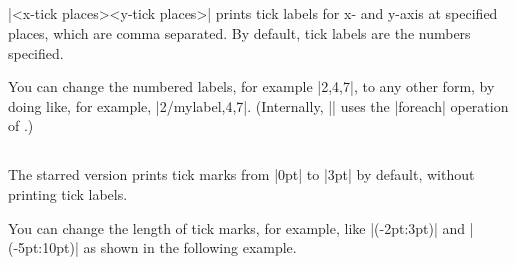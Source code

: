 \subsection{\protect\cmd{\tzticks}}
\label{ssi:tzticks}

\icmd{\tzticks}|{<x-tick places>}{<y-tick places>}| prints tick labels for x- and y-axis at specified places, which are comma separated.
By default, tick labels are the numbers specified.

\begin{tzcode}{.3}
\end{tzcode}

You can change the numbered labels, for example |{2,4,7}|, to any other form, by doing like, for example, |{2/mylabel,4,7}|. (Internally, |\tzticks| uses the |foreach| operation of \Tikz.)

\begin{tzcode}{.3}
\end{tzcode}

\subsection{\protect\cmd{\tzticks*}}
\label{ssi:tzticks*}

The starred version \icmd{\tzticks*} prints tick marks from |0pt| to |3pt| by default, without printing tick labels.

\begin{tzcode}{.3}
\end{tzcode}

You can change the length of tick marks, for example, like |(-2pt:3pt)| and |(-5pt:10pt)| as shown in the following example.

\begin{tzcode}{.3}
\end{tzcode}


